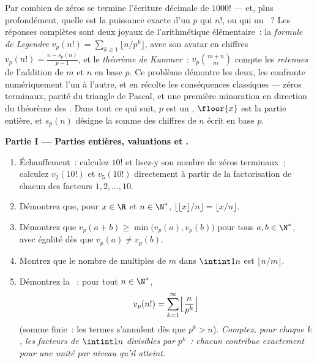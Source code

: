 \begin{problem}\label{pb:b1:arith:1}
Par combien de zéros se termine l'écriture décimale de $1000!$ --- et, plus
profondément, quelle est la puissance exacte d'un  $p$ qui  $n!$,
ou qui  un ~? Les réponses complètes sont deux joyaux de
l'arithmétique élémentaire~: la \emph{formule de Legendre}
 $v_p(n!) = \sum_{k\geq1}
\lfloor n/p^k \rfloor$, avec son avatar en chiffres $v_p(n!) = \frac{n
- s_p(n)}{p-1}$, et le \emph{théorème de Kummer}~: $v_p\binom{m+n}m$ compte les \emph{retenues} de l'addition de
$m$ et $n$ en base $p$. Ce problème démontre les deux, les confronte
numériquement l'un à l'autre, et en récolte les conséquences classiques
--- zéros terminaux, parité du triangle de Pascal,
et une première minoration en direction du théorème des .
Dans tout ce qui suit, $p$ est un , $\floor{x}$ est la partie entière, et
$s_p(n)$ désigne la somme des chiffres de $n$ écrit en base $p$.

\medskip
\noindent\textbf{Partie I --- Parties entières, valuations et .}
\begin{enumerate}
  \item Échauffement~: calculez $10!$ et lisez-y son nombre de zéros
        terminaux~; calculez $v_2(10!)$ et $v_5(10!)$ directement à partir de la
        factorisation de chacun des facteurs $1, 2, \dots, 10$.
  \item Démontrez que, pour $x \in \R$ et $n \in \N^*$,
        $\bigl\lfloor \lfloor x \rfloor / n \bigr\rfloor =
        \lfloor x/n \rfloor$.
  \item Démontrez que $v_p(a + b) \geq \min\bigl(v_p(a),
        v_p(b)\bigr)$ pour tous $a, b \in \N^*$, avec égalité
        dès que $v_p(a) \neq v_p(b)$.
  \item Montrez que le nombre de multiples de $m$ dans $\intint1n$ est
        $\lfloor n/m \rfloor$.
  \item Démontrez la \emph{}~: pour tout $n \in \N^*$,
        \[
        v_p(n!) = \sum_{k=1}^{\infty}
        \Bigl\lfloor \frac{n}{p^k} \Bigr\rfloor
        \]
        (somme finie~: les termes s'annulent dès que $p^k > n$).
        \emph{Comptez, pour chaque $k$, les facteurs de $\intint1n$
        divisibles par $p^k$~: chacun contribue exactement pour une unité par
        niveau qu'il atteint.}
\end{enumerate}


\end{problem}

